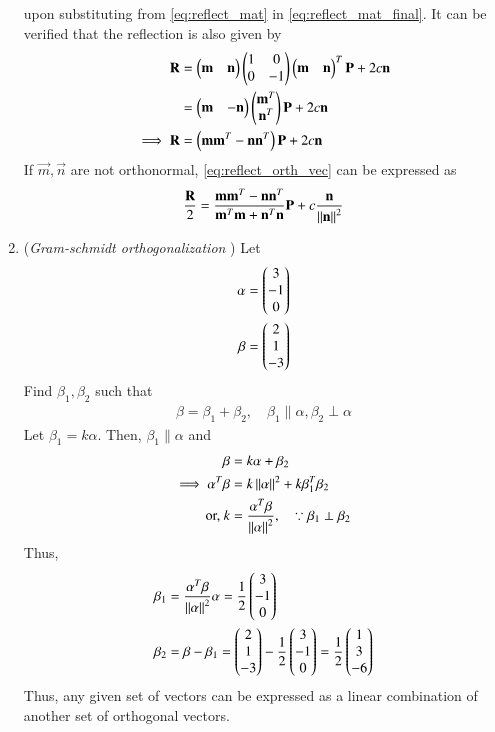 \begin{enumerate}[label=\thesubsection.\arabic*.,ref=\thesubsection.\theenumi]
upon substituting from \eqref{eq:reflect_mat} in \eqref{eq:reflect_mat_final}.
It can be verified that 
the reflection is also given by
\begin{align}
\mathbf{R} &= \begin{pmatrix}\mathbf{m} & \mathbf{n}\end{pmatrix}\begin{pmatrix}1 & 0 \\ 0 & -1\end{pmatrix}\begin{pmatrix}\mathbf{m} & \mathbf{n}\end{pmatrix}^T \mathbf{P}+2c \mathbf{n}
\\
 &= \begin{pmatrix}\mathbf{m} & -\mathbf{n}\end{pmatrix}\begin{pmatrix}\mathbf{m}^T \\ \mathbf{n}^T\end{pmatrix} \mathbf{P}+2c \mathbf{n}
\\
\implies \mathbf{R}&= \left(\mathbf{m}\mathbf{m}^T-\mathbf{n}\mathbf{n}^T\right)\mathbf{P} + 2c \mathbf{n} 
\label{eq:reflect_orth_vec}
\end{align}
If $\vec{m}, \vec{n}$ are not orthonormal, \eqref{eq:reflect_orth_vec}
can be expressed as
\begin{align}
 \frac{\mathbf{R}}{2}= \frac{\mathbf{m}\mathbf{m}^T-\mathbf{n}\mathbf{n}^T}{\mathbf{m}^T\mathbf{m}+\mathbf{n}^T\mathbf{n}}\mathbf{P} + c \frac{\mathbf{n}}{\left\lVert\mathbf{n}\right\rVert^2}
\label{eq:reflect_non_orth_vec}
\end{align}
\item ({\em Gram-schmidt orthogonalization }) Let 
\begin{align}
{\alpha} &= \begin{pmatrix}3\\-1\\0\end{pmatrix}
\\
 {\beta} &= \begin{pmatrix}2\\1\\-3\end{pmatrix}
\end{align}
Find ${\beta}_1, {\beta}_2 $ such 
that 
\begin{align}
{\beta}={\beta}_1+{\beta}_2, \quad {\beta}_1 \parallel  {\alpha},{\beta}_2 \perp {\alpha} 
\end{align}
%
\label{prob:line_gram_schmidt}
\solution Let ${\beta}_1 = k{\alpha}$.  Then, ${\beta}_1 \parallel {\alpha}$ and 
%
\begin{align}
{\beta} &= k{\alpha}+{\beta}_2
\\
\implies {\alpha}^T{\beta} &= k\left\lVert\alpha\right\rVert^2+k{\beta}_1^T{\beta}_2
\\
\text{or, } k &= \frac{{\alpha}^T{\beta}}{\left\lVert{\alpha}\right\rVert^2}, \quad \because {\beta}_1 \perp {\beta}_2
\end{align}
%
Thus,
%
\begin{align}
{\beta}_1 &= \frac{{\alpha}^T{\beta}}{\left\lVert{\alpha}\right\rVert^2}{\alpha} = \frac{1}{2}\begin{pmatrix}3\\-1\\0\end{pmatrix}
\\
{\beta}_2 &= {\beta}-{\beta}_1 = \begin{pmatrix}2\\1\\-3\end{pmatrix}- \frac{1}{2}\begin{pmatrix}3\\-1\\0\end{pmatrix} = \frac{1}{2}\begin{pmatrix}1\\3\\-6\end{pmatrix}
\end{align}
%
Thus, any given set of vectors can be expressed as a linear combination of another set of orthogonal vectors.  

\end{enumerate}
